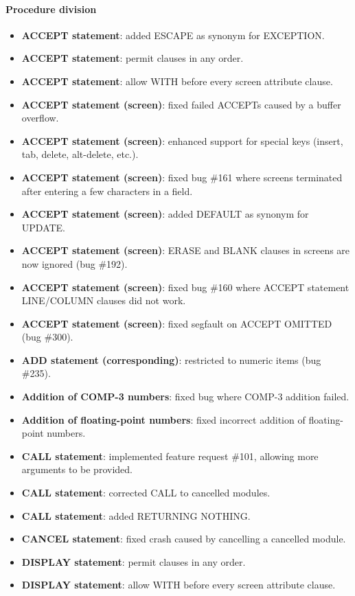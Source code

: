 \paragraph{Procedure division}
\begin{itemize}
\item \textbf{ACCEPT statement}: added ESCAPE as synonym for EXCEPTION.
\item \textbf{ACCEPT statement}: permit clauses in any order.
\item \textbf{ACCEPT statement}: allow WITH before every screen attribute clause.
\item \textbf{ACCEPT statement (screen)}: fixed failed ACCEPTs caused by a buffer overflow.
\item \textbf{ACCEPT statement (screen)}: enhanced support for special keys (insert, tab, delete, alt-delete, etc.).
\item \textbf{ACCEPT statement (screen)}: fixed bug \#161 where screens terminated after entering a few characters in a field.
\item \textbf{ACCEPT statement (screen)}: added DEFAULT as synonym for UPDATE.
\item \textbf{ACCEPT statement (screen)}: ERASE and BLANK clauses in screens are now ignored (bug \#192).
\item \textbf{ACCEPT statement (screen)}: fixed bug \#160 where ACCEPT statement LINE\slash{}COLUMN clauses did not work.
\item \textbf{ACCEPT statement (screen)}: fixed segfault on ACCEPT OMITTED (bug \#300).
\item \textbf{ADD statement (corresponding)}: restricted to numeric items (bug \#235).
\item \textbf{Addition of COMP-3 numbers}: fixed bug where COMP-3 addition failed.
\item \textbf{Addition of floating-point numbers}: fixed incorrect addition of floating-point numbers.
\item \textbf{CALL statement}: implemented feature request \#101, allowing more arguments to be provided.
\item \textbf{CALL statement}: corrected CALL to cancelled modules.
\item \textbf{CALL statement}: added RETURNING NOTHING.
\item \textbf{CANCEL statement}: fixed crash caused by cancelling a cancelled module.
\item \textbf{DISPLAY statement}: permit clauses in any order.
\item \textbf{DISPLAY statement}: allow WITH before every screen attribute clause.

\end{itemize}
